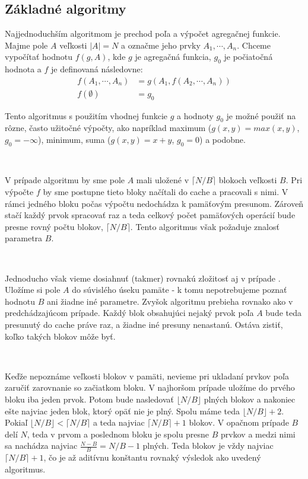 \documentclass[12pt,a4paper]{article}
\begin{document}
\subsection{Základné algoritmy}

Najjednoduchším \obliv algoritmom je prechod poľa a výpočet agregačnej funkcie. Majme pole $A$ veľkosti $|A| = N$ a označme jeho prvky $A_1,\cdots,A_n$. Chceme vypočítať hodnotu $f(g, A)$, kde $g$ je agregačná funkcia, $g_0$ je počiatočná hodnota a $f$ je definovaná následovne:
\[
\begin{aligned}
f(A_1,\cdots,A_n) &= g(A_1, f(A_2,\cdots,A_n)) \\
f(\emptyset) &= g_0
\end{aligned}
\]

Tento algoritmus s použitím vhodnej funkcie $g$ a hodnoty $g_0$ je možné použiť na rôzne, často užitočné výpočty, ako napríklad maximum ($g(x, y) = max(x, y)$, $g_0 = -\infty$), minimum, suma ($g(x,y) = x+y$, $g_0 = 0$) a podobne.

\

V prípade \aware algoritmu by sme pole $A$ mali uložené v $\lceil N/B \rceil$ blokoch veľkosti $B$. Pri výpočte $f$ by sme postupne tieto bloky načítali do cache a pracovali s nimi. V rámci jedného bloku počas výpočtu nedochádza k pamäťovým presunom. Zároveň stačí každý prvok spracovať raz a teda celkový počet pamäťových operácií bude presne rovný počtu blokov, $\lceil N/B \rceil$. Tento algoritmus však požaduje znalosť parametra $B$.

\

Jednoducho však vieme dosiahnuť (takmer) rovnakú zložitosť aj v prípade \obliv. Uložíme si pole $A$ do súvislého úseku pamäte - k tomu nepotrebujeme poznať hodnotu $B$ ani žiadne iné parametre. Zvyšok algoritmu prebieha rovnako ako v predchádzajúcom prípade. Každý blok obsahujúci nejaký prvok poľa $A$ bude teda presunutý do cache práve raz, a žiadne iné presuny nenastanú. Ostáva zistiť, koľko takých blokov môže byť.

\

Keďže nepoznáme veľkosti blokov v pamäti, nevieme pri ukladaní prvkov poľa zaručiť zarovnanie so začiatkom bloku. V najhoršom prípade uložíme do prvého bloku iba jeden prvok. Potom bude nasledovať $\lfloor N/B \rfloor$ plných blokov a nakoniec ešte najviac jeden blok, ktorý opäť nie je plný. Spolu máme teda $\lfloor N/B \rfloor + 2$. Pokiaľ $\lfloor N/B \rfloor < \lceil N/B \rceil$ a teda najviac $\lceil N/B \rceil + 1$ blokov. V opačnom prípade $B$ delí $N$, teda v prvom a poslednom bloku je spolu presne $B$ prvkov a medzi nimi sa nachádza najviac $\frac{N-B}{B} = N/B - 1$ plných. Teda blokov je vždy najviac $\lceil N/B \rceil +1$, čo je až aditívnu konštantu rovnaký výsledok ako uvedený \aware algoritmus.
\end{document}
